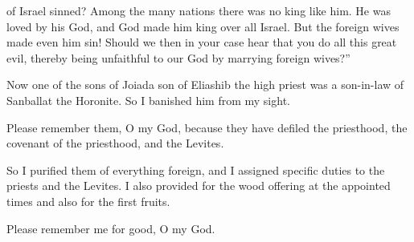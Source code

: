 {of Israel
sinned? Among the many
nations
there was no
king
like
him. He was loved
by his God,
and God
made him
king
over
all
Israel.
But the foreign
wives
made even
him sin!
Should we then in your case hear
that you do
all
this great
evil,
thereby being unfaithful
to our God
by marrying
foreign
wives?”
\par }{\PP {}Now one of the sons
of Joiada
son
of Eliashib
the high
priest
was a son-in-law
of Sanballat
the Horonite.
So I banished
him from my sight.
\par }{\PP {}Please remember
them,
O my God,
because they have defiled
the priesthood,
the covenant
of the priesthood,
and the Levites.
\par }{\PP {}So I purified
them of everything
foreign,
and I assigned
specific
duties
to the priests
and the Levites.
I also provided for the wood
offering at
the appointed
times
and also for the first fruits.
\par }{\PP Please remember
me for good,
O my God.
\par }